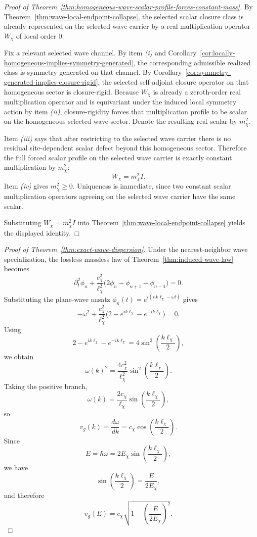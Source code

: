 \begin{proof}[Proof of Theorem~\ref{thm:homogeneous-wave-scalar-profile-forces-constant-mass}]
\label{proof:thm:homogeneous-wave-scalar-profile-forces-constant-mass}
By Theorem~\ref{thm:wave-local-endpoint-collapse}, the selected scalar closure
class is already represented on the selected wave carrier by a real
multiplication operator \(W_{\chi}\) of local order \(0\).

Fix a relevant selected wave channel. By item \emph{(i)} and
Corollary~\ref{cor:locally-homogeneous-implies-symmetry-generated}, the
corresponding admissible realized class is symmetry-generated on that channel.
By Corollary~\ref{cor:symmetry-generated-implies-closure-rigid}, the selected
self-adjoint closure operator on that homogeneous sector is closure-rigid.
Because \(W_{\chi}\) is already a zeroth-order real multiplication operator and
is equivariant under the induced local symmetry action by item \emph{(ii)},
closure-rigidity forces that multiplication profile to be scalar on the
homogeneous selected-wave sector. Denote the resulting real scalar by
\(m_{\chi}^2\).

Item \emph{(iii)} says that after restricting to the selected wave carrier
there is no residual site-dependent scalar defect beyond this homogeneous
sector. Therefore the full forced scalar profile on the selected wave carrier
is exactly constant multiplication by \(m_{\chi}^2\):
\[
W_{\chi}=m_{\chi}^2 I.
\]
Item \emph{(iv)} gives \(m_{\chi}^2\ge 0\). Uniqueness is immediate, since two
constant scalar multiplication operators agreeing on the selected wave carrier
have the same scalar.

Substituting \(W_{\chi}=m_{\chi}^2 I\) into
Theorem~\ref{thm:wave-local-endpoint-collapse} yields the displayed identity.
\end{proof}

\begin{proof}[Proof of Theorem~\ref{thm:exact-wave-dispersion}]
\label{proof:thm:exact-wave-dispersion}
Under the nearest-neighbor wave specialization, the lossless massless law of
Theorem~\ref{thm:induced-wave-law} becomes
\[
\partial_t^2\phi_n
+
\frac{c_{\chi}^2}{\ell_{\chi}^2}
\bigl(2\phi_n-\phi_{n+1}-\phi_{n-1}\bigr)
=
0.
\]
Substituting the plane-wave ansatz
\(\phi_n(t)=e^{i(nk\ell_{\chi}-\omega t)}\) gives
\[
-\omega^2
+
\frac{c_{\chi}^2}{\ell_{\chi}^2}
\bigl(2-e^{ik\ell_{\chi}}-e^{-ik\ell_{\chi}}\bigr)
=
0.
\]
Using
\[
2-e^{ik\ell_{\chi}}-e^{-ik\ell_{\chi}}
=
4\sin^2\!\left(\frac{k\ell_{\chi}}{2}\right),
\]
we obtain
\[
\omega(k)^2
=
\frac{4c_{\chi}^2}{\ell_{\chi}^2}
\sin^2\!\left(\frac{k\ell_{\chi}}{2}\right).
\]
Taking the positive branch,
\[
\omega(k)
=
\frac{2c_{\chi}}{\ell_{\chi}}
\sin\!\left(\frac{k\ell_{\chi}}{2}\right),
\]
so
\[
v_g(k)
=
\frac{d\omega}{dk}
=
c_{\chi}\cos\!\left(\frac{k\ell_{\chi}}{2}\right).
\]
Since
\[
E=\hbar\omega
=
2E_{\chi}\sin\!\left(\frac{k\ell_{\chi}}{2}\right),
\]
we have
\[
\sin\!\left(\frac{k\ell_{\chi}}{2}\right)=\frac{E}{2E_{\chi}},
\]
and therefore
\[
v_g(E)
=
c_{\chi}\sqrt{1-\left(\frac{E}{2E_{\chi}}\right)^2}.
\]
\end{proof}

